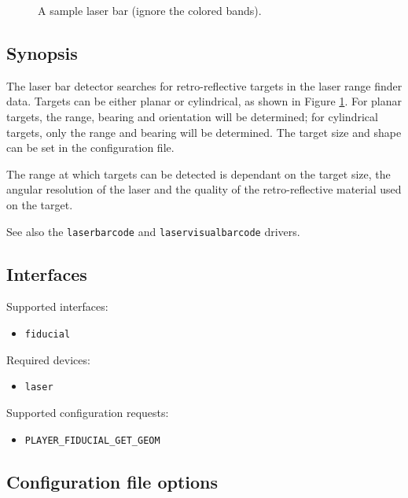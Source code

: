 
\begin{figure}[ht]
\begin{center}
\caption{A sample laser bar (ignore the colored bands).}
\label{fig:laserbar}
\end{center}
\end{figure}

\subsection*{Synopsis}

The laser bar detector searches for retro-reflective targets in the
laser range finder data.  Targets can be either planar or cylindrical,
as shown in Figure \ref{fig:laserbar}.  For planar targets, the range,
bearing and orientation will be determined; for cylindrical targets,
only the range and bearing will be determined.  The target size and
shape can be set in the configuration file.

The range at which targets can be detected is dependant on the target
size, the angular resolution of the laser and the quality of the
retro-reflective material used on the target.

See also the {\tt laserbarcode} and {\tt laservisualbarcode} drivers.

\subsection*{Interfaces}

\noindent Supported interfaces:
\begin{itemize}
\item {\tt fiducial}
\end{itemize}

\noindent Required devices:
\begin{itemize}
\item {\tt laser}
\end{itemize}

\noindent Supported configuration requests:
\begin{itemize}
\item \verb+PLAYER_FIDUCIAL_GET_GEOM+
\end{itemize}


\subsection*{Configuration file options}

